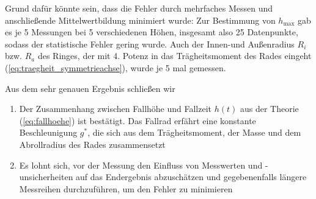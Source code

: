 Grund dafür könnte sein, dass die Fehler durch mehrfaches Messen und anschließende Mittelwertbildung minimiert wurde: Zur Bestimmung von $h_{\text{max}}$ gab es je 5 Messungen bei 5 verschiedenen Höhen, insgesamt also 25 Datenpunkte, sodass der statistische Fehler gering wurde.
Auch der Innen-und Außenradius $R_i$ bzw. $R_a$ des Ringes, der mit 4. Potenz in das Trägheitsmoment des Rades eingeht (\cref{eq:traegheit_symmetrieachse}), wurde je 5 mal gemessen. 

Aus dem sehr genauen Ergebnis schließen wir
\begin{enumerate}
  \item Der Zusammenhang zwischen Fallhöhe und Fallzeit $h(t)$ aus der Theorie (\cref{eq:fallhoehe}) ist bestätigt. Das Fallrad erfährt eine konstante Beschleunigung $g^*$, die sich aus dem Trägheitsmoment, der Masse und dem Abrollradius des Rades zusammensetzt
  \item Es lohnt sich, vor der Messung den Einfluss von Messwerten und -unsicherheiten auf das Endergebnis abzuschätzen und gegebenenfalls längere Messreihen durchzuführen, um den Fehler zu minimieren
\end{enumerate}

\nocite{anleitung-ws2014}
